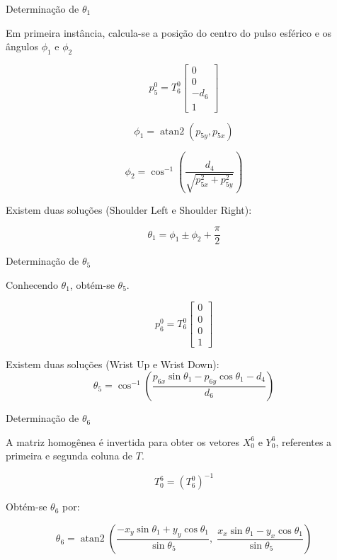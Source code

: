 \documentclass[xcolor=dvipsnames,aspectratio=169]{beamer}
\begin{document}
\begin{frame}{Determinação de $\theta_1$}

    Em primeira instância, calcula-se a posição do centro do pulso esférico e os ângulos \(\phi_1\) e \(\phi_2\)

    \[
        p_5^{0}=
        T_6^{0}
        \begin{bmatrix}
            0    \\
            0    \\
            -d_6 \\
            1
        \end{bmatrix}
    \]

    \[
        \phi_1=
        \operatorname{atan2}(p_{5y},p_{5x})
    \]

    \[
        \phi_2=
        \cos^{-1}
        \left(
        \frac{d_4}
        {\sqrt{p_{5x}^2+p_{5y}^2}}
        \right)
    \]

    Existem duas soluções (Shoulder Left e Shoulder Right):

    \[
        \theta_1=
        \phi_1\pm\phi_2+\frac{\pi}{2}
    \]

\end{frame}

\begin{frame}{Determinação de $\theta_5$}

    Conhecendo $\theta_1$, obtém-se \(\theta_5\).

    \[
        p_6^{0}=
        T_6^{0}
        \begin{bmatrix}
            0 \\
            0 \\
            0 \\
            1
        \end{bmatrix}
    \]

    Existem duas soluções (Wrist Up e Wrist Down):
    \[
        \theta_5=
        \cos^{-1}
        \left(
        \frac{
            p_{6x}\sin\theta_1
            -
            p_{6y}\cos\theta_1
            -
            d_4
        }
        {d_6}
        \right)
    \]


\end{frame}

\begin{frame}{Determinação de $\theta_6$}

    A matriz homogênea é invertida para obter os vetores \(X_0^{6}\) e \(Y_0^{6}\), referentes a primeira e segunda coluna de \(T\).

    \[
        T_0^{6}
        =
        (T_6^{0})^{-1}
    \]

    Obtém-se \(\theta_6\) por:

    \[
        \theta_6=
        \operatorname{atan2}
        \left(
        \frac{-x_y\sin\theta_1+y_y\cos\theta_1}
        {\sin\theta_5},
        \;
        \frac{x_x\sin\theta_1-y_x\cos\theta_1}
        {\sin\theta_5}
        \right)
    \]

\end{frame}
\end{document}
